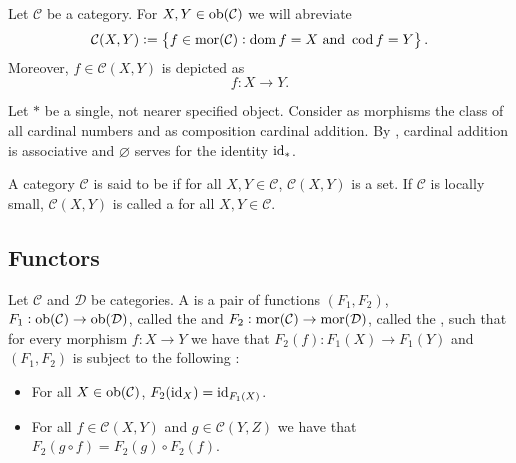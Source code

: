 \begin{remark}
	Let $\mathcal{C}$ be a category. For $X,Y \in \operatorname{ob}(\mathcal{C})$ we will abreviate
	\begin{equation*}
		\mathcal{C}(X,Y) := \cbr{f \in \mor(\mathcal{C}) : \dom f = X \text{ and } \cod f = Y}.
	\end{equation*}
	Moreover, $f \in \mathcal{C}(X,Y)$ is depicted as
	\begin{equation}
		f : X \to Y.
	\end{equation}
\end{remark}

\begin{example}
	Let $\ast$ be a single, not nearer specified object. Consider as morphisms the class of all cardinal numbers and as composition cardinal addition. By \cite[112--113]{halbeisen:set_theory:2012}, cardinal addition is associative and $\varnothing$ serves for the identity $\operatorname{id}_\ast$.  
\end{example}

\begin{definition}
	A category $\mathcal{C}$ is said to be  if for all $X,Y \in \mathcal{C}$, $\mathcal{C}(X,Y)$ is a set. If $\mathcal{C}$ is locally small, $\mathcal{C}(X,Y)$ is called a  for all $X,Y \in \mathcal{C}$. 
\end{definition}

\subsection*{Functors}

\begin{definition}[Functor]
	Let $\mathcal{C}$ and $\mathcal{D}$ be categories. A  is a pair of functions $(F_1,F_2)$, $F_1 : \operatorname{ob}(\mathcal{C}) \to \operatorname{ob}(\mathcal{D})$, called the  and $F_2 : \operatorname{mor}(\mathcal{C}) \to \operatorname{mor}(\mathcal{D})$, called the , such that for every morphism $f : X \to Y$ we have that $F_2(f) : F_1(X) \to F_1(Y)$ and $(F_1,F_2)$ is subject to the following :
	\begin{itemize}[leftmargin = *]
		\item For all $X \in \operatorname{ob}(\mathcal{C})$, $F_2(\operatorname{id}_X) = \operatorname{id}_{F_1(X)}$.
		\item For all $f \in \mathcal{C}(X,Y)$ and $g \in \mathcal{C}(Y,Z)$ we have that $F_2(g \circ f) = F_2(g) \circ F_2(f)$.
	\end{itemize}
\end{definition}

